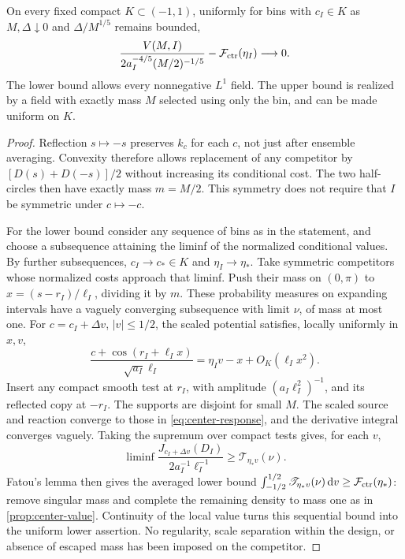 \begin{lemma}
\label{lem:conditional-localization}
On every fixed compact $K\subset(-1,1)$, uniformly for bins with
$c_I\in K$ as $M,\Delta\downarrow0$ and
$\Delta/M^{1/5}$ remains bounded,
\begin{equation}\label{eq:conditional-limit}
 \frac{V(M,I)}{2a_I^{-4/5}(M/2)^{-1/5}}
                    -\mathcal F_{\rm ctr}(\eta_I)\longrightarrow0.
\end{equation}
The lower bound allows every nonnegative $L^1$ field. The upper
bound is realized by a field with exactly mass $M$ selected using
only the bin, and can be made uniform on $K$.
\end{lemma}
\begin{proof}
Reflection $s\mapsto-s$ preserves $k_c$ for each $c$, not just
after ensemble averaging. Convexity therefore allows replacement
of any competitor by $[D(s)+D(-s)]/2$ without increasing its
conditional cost. The two half-circles then have exactly mass
$m=M/2$. This symmetry does not require that $I$ be symmetric
under $c\mapsto-c$.

For the lower bound consider any sequence of bins as in the
statement, and choose a subsequence attaining the liminf of the
normalized conditional values. By further subsequences,
$c_I\to c_*\in K$ and $\eta_I\to\eta_*$. Take symmetric
competitors whose normalized costs approach that liminf. Push
their mass on $(0,\pi)$ to $x=(s-r_I)/\ell_I$, dividing it by
$m$. These probability measures on expanding intervals have a
vaguely converging subsequence with limit $\nu$, of mass at most
one. For $c=c_I+\Delta v$, $|v|\le1/2$, the scaled potential
satisfies, locally uniformly in $x,v$,
\[
 \frac{c+\cos(r_I+\ell_I x)}{\sqrt{a_I}\ell_I}
              =\eta_Iv-x+O_K(\ell_Ix^2).
\]
Insert any compact smooth test at $r_I$, with amplitude
$(a_I\ell_I^2)^{-1}$, and its reflected copy at $-r_I$.
The supports are disjoint for small $M$. The scaled source and
reaction converge to those in \eqref{eq:center-response}, and
the derivative integral converges vaguely. Taking the supremum
over compact tests gives, for each $v$,
\begin{equation}\label{eq:conditional-liminf}
 \liminf\frac{J_{c_I+\Delta v}(D_I)}{2a_I^{-1}\ell_I^{-1}}
                         \ge\mathscr T_{\eta_*v}(\nu).
\end{equation}
Fatou's lemma then gives the averaged lower bound
$\int_{-1/2}^{1/2}\mathscr T_{\eta_*v}(\nu)\,\mathrm d v
\ge\mathcal F_{\rm ctr}(\eta_*)$: remove singular mass and
complete the remaining density to mass one as in
\cref{prop:center-value}. Continuity of the local value turns
this sequential bound into the uniform lower assertion. No
regularity, scale separation within the design, or absence of
escaped mass has been imposed on the competitor.


\end{proof}
